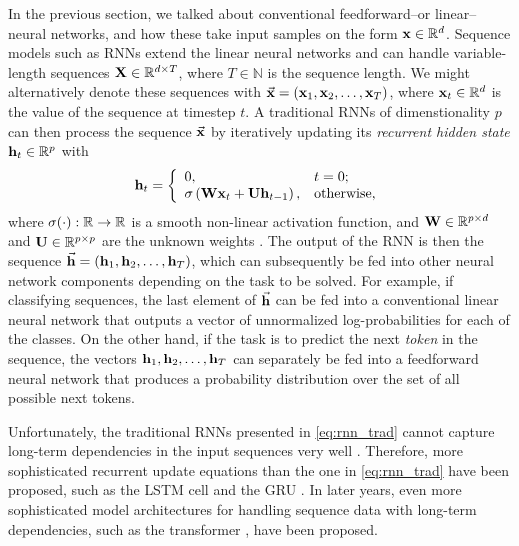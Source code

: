 \documentclass{statsmsc}
\begin{document}
{In the previous section, we talked about conventional feedforward--or linear--neural networks,
and how these take input samples on the form $\mathbf{x} \in \mathbb{R}^d$. Sequence models such as
\acp{RNN} extend the linear neural networks and can handle variable-length sequences
$\mathbf{X} \in \mathbb{R}^{d \times T}$, where $T \in \mathbb{N}$ is the sequence length. We might alternatively
denote these sequences with $\vec{\mathbf{x}}=(\mathbf{x}_1,\mathbf{x}_2,\dots,\mathbf{x}_T)$, where $\mathbf{x}_t\in\mathbb{R}^d$ is the
value of the sequence at timestep $t$.
A traditional \acp{RNN} of dimenstionality $p$ can then process the sequence $\vec{\mathbf{x}}$ by
iteratively updating its \textit{recurrent hidden state} $\mathbf{h}_t \in
\mathbb{R}^{p}$ with
\begin{equation}\label{eq:rnn_trad}
    \mathbf{h}_t=
    \left\{
        \begin{array}{ll}
            0, & t=0; \\
            \sigma\left(\mathbf{W}\mathbf{x}_t + \mathbf{U}\mathbf{h}_{t-1} \right), & \textrm{otherwise,}
        \end{array}
    \right.
\end{equation}
where $\sigma(\cdot): \mathbb{R} \rightarrow {\mathbb{R}}$ is a smooth non-linear activation function,
and $\mathbf{W} \in \mathbb{R}^{p \times d}$ and $\mathbf{U} \in \mathbb{R}^{p \times p}$ are the unknown
weights \citep{gru}.
The output of the \ac{RNN} is then the sequence
$\vec{\mathbf{h}}=\left(\mathbf{h}_1,\mathbf{h}_2,\dots,\mathbf{h}_T \right)$, which can subsequently be fed into other
neural network components depending on the task to be solved. For example, if
classifying sequences, the last element of $\vec{\mathbf{h}}$ can be fed into a conventional
linear neural network that outputs a vector of unnormalized log-probabilities for each of
the classes. On the other hand, if the task is to predict the next \textit{token} in the
sequence, the vectors $\mathbf{h}_1,\mathbf{h}_2,\dots,\mathbf{h}_T$ can separately be fed into a feedforward
neural network that produces a probability distribution over the set of all possible next tokens.

Unfortunately, the traditional \acp{RNN} presented in \cref{eq:rnn_trad} cannot
capture long-term dependencies in the input sequences very well
\citep{long_term_dep}. Therefore, more sophisticated recurrent update equations
than the one in \cref{eq:rnn_trad} have been proposed, such as the \ac{LSTM}
cell \citep{lstm} and the \ac{GRU} \citep{gru_cho}.
In later years, even more sophisticated model architectures for handling sequence data with
long-term dependencies, such as the transformer \citep{attention}, have been proposed.

}
\end{document}
